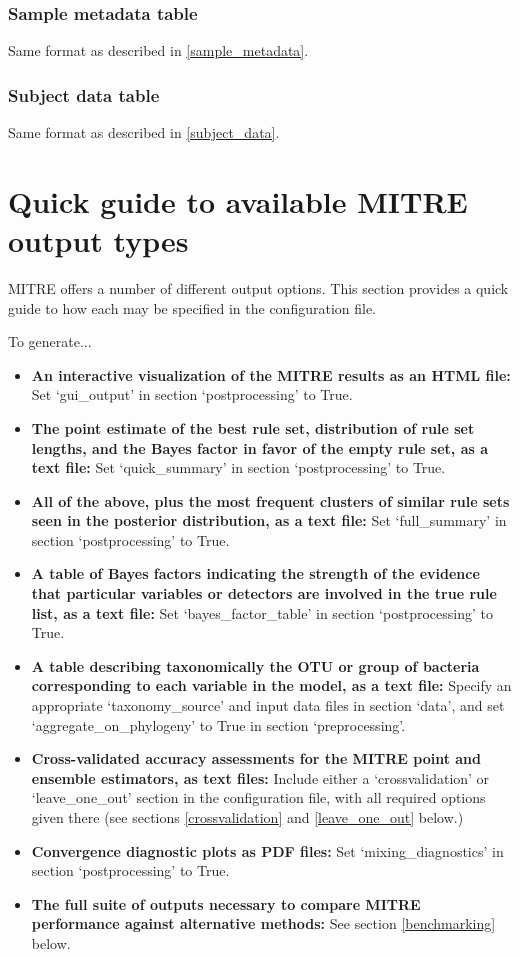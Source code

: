 \documentclass[12pt]{report}
\begin{document}
\subsection{Sample metadata table} Same format as described in \ref{sample_metadata}.

\subsection{Subject data table} Same format as described in \ref{subject_data}.

\chapter{Quick guide to available MITRE output types}
MITRE offers a number of different output options. This section
provides a quick guide to how each may be specified in the configuration
file.

To generate...
\begin{itemize}
\item \textbf{An interactive visualization of the MITRE results as an
  HTML file:} Set `gui\_output' in section `postprocessing' to True.
\item \textbf{The point estimate of the best rule set, distribution of
  rule set lengths, and the Bayes factor in favor of the empty rule
  set, as a text file:} Set `quick\_summary' in section
  `postprocessing' to True.
\item \textbf{All of the above, plus the most frequent clusters of
  similar rule sets seen in the posterior distribution, as a text
  file:} Set `full\_summary' in section `postprocessing' to True.
\item \textbf{A table of Bayes factors indicating the strength of the
  evidence that particular variables or detectors are involved in the
  true rule list, as a text file:} Set `bayes\_factor\_table' in
  section `postprocessing' to True.
\item \textbf{A table describing taxonomically the OTU or group of
  bacteria corresponding to each variable in the model, as a text
  file:} Specify an appropriate `taxonomy\_source' and input data
  files in section `data', and set `aggregate\_on\_phylogeny' to True
  in section `preprocessing'.
\item \textbf{Cross-validated accuracy assessments for the MITRE point
  and ensemble estimators, as text files:} Include either a `crossvalidation' or
  `leave\_one\_out' section in the configuration file, with all
  required options given there (see sections \ref{crossvalidation} and
  \ref{leave_one_out} below.)
\item \textbf{Convergence diagnostic plots as PDF files:} Set
  `mixing\_diagnostics' in section `postprocessing' to True.
\item \textbf{The full suite of outputs necessary to compare MITRE
  performance against alternative methods:} See section
  \ref{benchmarking} below.
\end{itemize}  
\end{document}
